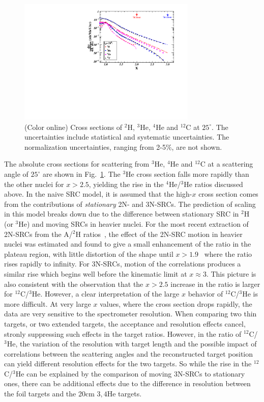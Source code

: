 \documentclass[aps,prl,superscriptaddress,showpacs,twocolumn,floatfix,amsmath,amssymb]{revtex4-1}
\begin{document}
                \begin{figure}[!ht]
		\begin{center}
		\includegraphics[width=8.5cm,angle=0]{Plot_XS_25_MC}
		\end{center}
		\vspace*{-5mm}
		\caption{(Color online) Cross sections of $^2$H, $^3$He, $^4$He and $^{12}$C at $25^{\circ}$. The uncertainties include statistical and
		systematic uncertainties. The normalization uncertainties, ranging from 2-5\%, are not shown.}
		\label{xs}
		\end{figure}

The absolute cross sections for scattering from $^{3}$He, $^{4}$He and $^{12}$C at a scattering angle of
$25^{\circ}$ are shown in Fig.~\ref{xs}. The $^3$He cross section falls more rapidly than the other nuclei
for $x>2.5$, yielding the rise in the $^4$He/$^3$He ratios discussed above. In the naive SRC model, it is
assumed that the high-$x$ cross section comes from the contributions of \textit{stationary} 2N- and 3N-SRCs.
The prediction of scaling in this model breaks down due to the difference between stationary SRC in $^2$H
(or $^3$He) and moving SRCs in heavier nuclei. For the most recent extraction of 2N-SRCs from the A/$^2$H
ratios~\cite{fomin2012}, the effect of the 2N-SRC motion in heavier nuclei was estimated and found to give a
small enhancement of the ratio in the plateau region, with little distortion of the shape until $x >
1.9$~\cite{fomin2012} where the ratio rises rapidly to infinity. For 3N-SRCs, motion of the correlations
produces a similar rise which begins well before the kinematic limit at $x \approx 3$. This picture is also
consistent with the observation that the $x > 2.5$ increase in the ratio is larger for $^{12}$C/$^3$He.
However, a clear interpretation of the large $x$ behavior of $^{12}$C/$^3$He is more difficult. At very large
$x$ values, where the cross section drops rapidly, the data are very sensitive to the spectrometer resolution.
When comparing two thin targets, or two extended targets, the acceptance and resolution effects cancel, 
stronly suppressing such effects in the target ratios. However, in the ratio of $^{12}$C/$^3$He, the variation
of the resolution with target length and the possible impact of correlations between the scattering angles and
the reconstructed target position can yield different resolution effects for the two targets. So while the
rise in the $^{12}$C/$^3$He can be explained by the comparison of moving 3N-SRCs to stationary ones, there
can be additional effects due to the difference in resolution between the foil targets and the 20cm ${3,4}$He
targets.
\end{document}
